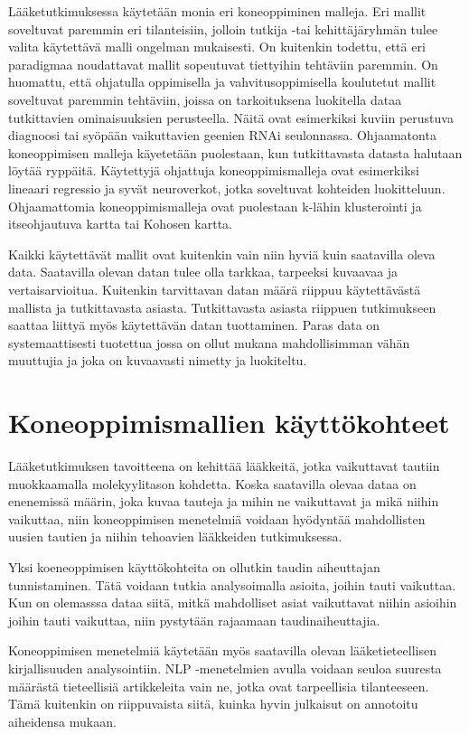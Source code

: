 \documentclass[finnish,twoside,censored,essay,sw-line]{HYthesisML}
\begin{document}
Lääketutkimuksessa käytetään monia eri koneoppiminen malleja. Eri mallit soveltuvat paremmin eri tilanteisiin,
jolloin tutkija -tai kehittäjäryhmän tulee valita käytettävä malli ongelman mukaisesti. On kuitenkin todettu, että
eri paradigmaa noudattavat mallit sopeutuvat tiettyihin tehtäviin paremmin. On huomattu, että ohjatulla oppimisella
ja vahvitusoppimisella koulutetut mallit soveltuvat paremmin tehtäviin, joissa on tarkoituksena luokitella
dataa tutkittavien ominaisuuksien perusteella. Näitä ovat esimerkiksi kuviin perustuva diagnoosi tai syöpään
vaikuttavien geenien RNAi seulonnassa. Ohjaamatonta koneoppimisen malleja käyetetään puolestaan, kun tutkittavasta datasta halutaan löytää ryppäitä.
Käytettyjä ohjattuja koneoppimismalleja ovat esimerkiksi lineaari regressio ja syvät neuroverkot, jotka soveltuvat
kohteiden luokitteluun. Ohjaamattomia koneoppimismalleja ovat puolestaan k-lähin klusterointi ja itseohjautuva kartta
tai Kohosen kartta.

Kaikki käytettävät mallit ovat kuitenkin vain niin hyviä kuin saatavilla oleva data. Saatavilla olevan datan
tulee olla tarkkaa, tarpeeksi kuvaavaa ja vertaisarvioitua. Kuitenkin tarvittavan datan määrä riippuu käytettävästä
mallista ja tutkittavasta asiasta. Tutkittavasta asiasta riippuen tutkimukseen saattaa liittyä myös käytettävän datan
tuottaminen. Paras data on systemaattisesti tuotettua jossa on ollut mukana mahdollisimman vähän muuttujia
ja joka on kuvaavasti nimetty ja luokiteltu.

\chapter{Koneoppimismallien käyttökohteet}

Lääketutkimuksen tavoitteena on kehittää lääkkeitä, jotka vaikuttavat tautiin muokkaamalla molekyylitason kohdetta.
Koska saatavilla olevaa dataa on enenemissä määrin, joka kuvaa tauteja ja mihin ne vaikuttavat ja mikä niihin
vaikuttaa, niin koneoppimisen menetelmiä voidaan hyödyntää mahdollisten uusien tautien ja niihin tehoavien lääkkeiden
tutkimuksessa.

Yksi koeneoppimisen käyttökohteita on ollutkin taudin aiheuttajan tunnistaminen. Tätä voidaan tutkia
analysoimalla asioita, joihin tauti vaikuttaa. Kun on olemasssa dataa siitä, mitkä mahdolliset asiat vaikuttavat
niihin asioihin joihin tauti vaikuttaa, niin pystytään rajaamaan taudinaiheuttajia.

Koneoppimisen menetelmiä käytetään myös saatavilla olevan lääketieteellisen kirjallisuuden analysointiin.
NLP -menetelmien avulla voidaan seuloa suuresta määrästä tieteellisiä artikkeleita vain ne, jotka ovat
tarpeellisia tilanteeseen. Tämä kuitenkin on riippuvaista siitä, kuinka hyvin julkaisut on annotoitu aiheidensa
mukaan.
\end{document}
